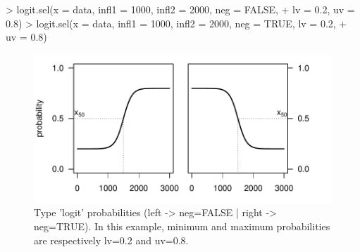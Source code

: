 \documentclass[letterpaper, 12pt]{article}
\begin{document}
\vspace*{\fill}
\newpage


\begin{Schunk}
\begin{Sinput}
> logit.sel(x = data, infl1 = 1000, infl2 = 2000, neg = FALSE, 
+     lv = 0.2, uv = 0.8)
> logit.sel(x = data, infl1 = 1000, infl2 = 2000, neg = TRUE, lv = 0.2, 
+     uv = 0.8)
\end{Sinput}
\end{Schunk}

\begin{figure}[h]
\vspace{-20pt}
\begin{center}
\includegraphics{relation_sel-027}
\end{center}
\vspace{-30pt}
\caption{Type 'logit' probabilities (left -> neg=FALSE |  right -> neg=TRUE). In this example, minimum and maximum probabilities are respectively lv=0.2 and uv=0.8.}
\vspace{-10pt}
\label{fig13}
\end{figure}

\newpage
\end{document}
